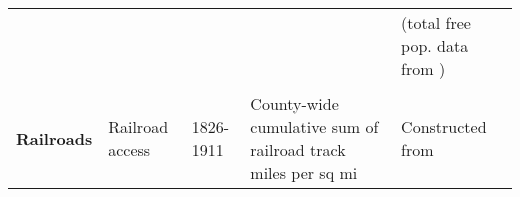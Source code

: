 \begin{tabular}{@{}l|llll@{}}
                        		           &                                                             &                                    &             &            (total free pop. data from \citet{haines2010})                                                                                         \\      
                                   &                                                             &                                    &             &                                                                                                                                                                                                   \\       
\textbf{Railroads} 	 & Railroad  access                                           & 1826-1911                          &  County-wide cumulative sum of railroad track miles per sq mi      &  Constructed from \cite{atack2013use}      \\
  \hline\hline                                                                                                                               
\end{tabular}
